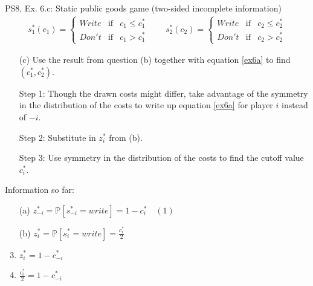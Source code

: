\begin{frame}{PS8, Ex. 6.c: Static public goods game (two-sided incomplete information)}
    \begin{align*}
      s_1^*(c_1)=\left\{\begin{array}{rcl}
        Write & \text{if} & c_1\leq c_1^*\\
        Don't & \text{if} & c_1>c_1^*
        \end{array}\right.\quad\quad
      s_2^*(c_2)=\left\{\begin{array}{rcl}
        Write & \text{if} & c_2\leq c_2^*\\
        Don't & \text{if} & c_2>c_2^*
        \end{array}\right.
    \end{align*}
    \vspace{-12pt}
    \begin{itemize}
      \item[(c)] Use the result from question (b) together with equation \eqref{ex6a} to find $(c_1^* , c_2^*)$.
    \end{itemize}
    \begin{multicols}{2}
      \begin{itemize}
        \item[Step 1:] Though the drawn costs might differ, take advantage of the symmetry in the distribution of the costs to write up equation \eqref{ex6a} for player $i$ instead of $-i$.
        \item[Step 2:] Substitute in $z_i^*$ from (b).
        \item[Step 3:] Use symmetry in the distribution of the costs to find the cutoff value $c_i^*$.
      \end{itemize}
      \vfill\null\columnbreak
      Information so far:
      \begin{enumerate}
        \item[(a)] $z_{-i}^*=\mathbb{P}[s_{-i}^*=write]=1-c_i^*\quad(1)$
        \item[(b)] $z_i^*=\mathbb{P}[s_i^*=write]=\frac{c_i^*}{2}$
        \item      $z_i^*=1-c_{-i}^*$
        \item      $\frac{c_i^*}{2}=1-c_{-i}^*$
      \end{enumerate}
      \vfill\null
    \end{multicols}
\end{frame}
